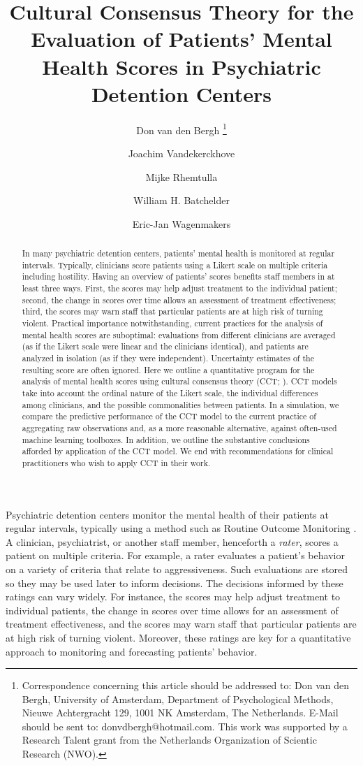 \documentclass[a4paper]{article}
\title{Cultural Consensus Theory for the Evaluation of Patients' Mental Health Scores in Psychiatric Detention Centers}
\author[1]{Don van den Bergh%
\thanks{Correspondence concerning this article should be addressed to: Don van den Bergh, University of Amsterdam, Department of Psychological Methods, Nieuwe Achtergracht 129, 1001 NK Amsterdam, The Netherlands. E-Mail should be sent to: donvdbergh@hotmail.com. This work was supported by a Research Talent grant from the Netherlands Organization of Scientic Research (NWO).
}}
\author[2]{Joachim Vandekerckhove}
\author[3]{\authorcr Mijke Rhemtulla}
\author[2]{William H. Batchelder}
\author[1]{\authorcr Eric-Jan Wagenmakers}
\affil[1]{University of Amsterdam}
\affil[2]{University of California Irvine}
\affil[3]{University of California Davis}
\date{}
\begin{document}
\listoftodos

\maketitle

\begin{abstract}
In many psychiatric detention centers, patients' mental health is monitored at regular intervals. Typically, clinicians score patients using a Likert scale on multiple criteria including hostility. Having an overview of patients’ scores benefits staff members in at least three ways. First, the scores may help adjust treatment to the individual patient; second, the change in scores over time allows an assessment of treatment effectiveness; third, the scores may warn staff that particular patients are at high risk of turning violent. Practical importance notwithstanding, current practices for the analysis of mental health scores are suboptimal: evaluations from different clinicians are averaged (as if the Likert scale were linear and the clinicians identical), and patients are analyzed in isolation (as if they were independent). Uncertainty estimates of the resulting score are often ignored. Here we outline a quantitative program for the analysis of mental health scores using cultural consensus theory (CCT; ). CCT models take into account the ordinal nature of the Likert scale, the individual differences among clinicians, and the possible commonalities between patients. In a simulation, we compare the predictive performance of the CCT model to the current practice of aggregating raw observations and, as a more reasonable alternative, against often-used machine learning toolboxes. In addition, we outline the substantive conclusions afforded by application of the CCT model. We end with recommendations for clinical practitioners who wish to apply CCT in their work. 
\end{abstract}
\newpage


Psychiatric detention centers monitor the mental health of their patients at regular intervals, typically using a method such as Routine Outcome Monitoring \cite{deBeurs2011ROM}. A clinician, psychiatrist, or another staff member, henceforth a \textit{rater}, scores a patient on multiple criteria. For example, a rater evaluates a patient's behavior on a variety of criteria that relate to aggressiveness. Such evaluations are stored so they may be used later to inform decisions. The decisions informed by these ratings can vary widely. For instance, the scores may help adjust treatment to individual patients, the change in scores over time allows for an assessment of treatment effectiveness, and the scores may warn staff that particular patients are at high risk of turning violent. Moreover, these ratings are key for a quantitative approach to monitoring and forecasting patients' behavior.
\end{document}
